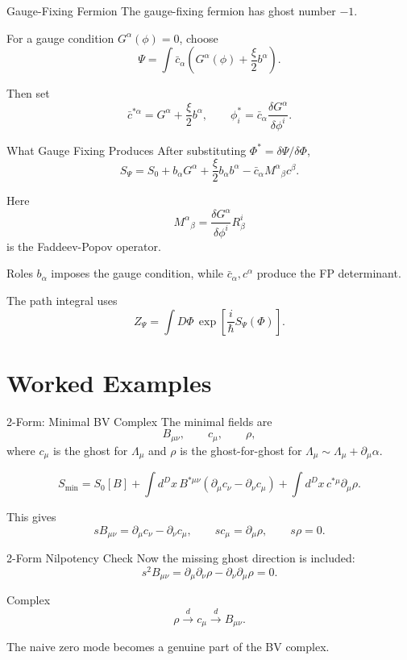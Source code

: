 \documentclass[aspectratio=169,professionalfonts]{beamer}
\begin{document}
\begin{frame}{Gauge-Fixing Fermion}
  The gauge-fixing fermion has ghost number $-1$.

  For a gauge condition $G^\alpha(\phi)=0$, choose
  \[
    \Psi
    =\int \bar c_\alpha
    \left(G^\alpha(\phi)+\frac{\xi}{2}b^\alpha\right).
  \]

  Then set
  \[
    \bar c^{*\alpha}=G^\alpha+\frac{\xi}{2}b^\alpha,
    \qquad
    \phi_i^*=\bar c_\alpha\frac{\delta G^\alpha}{\delta\phi^i}.
  \]
\end{frame}

\begin{frame}{What Gauge Fixing Produces}
  After substituting $\Phi^*=\delta\Psi/\delta\Phi$,
  \[
    S_\Psi
    =S_0
    +b_\alpha G^\alpha
    +\frac{\xi}{2}b_\alpha b^\alpha
    -\bar c_\alpha M^\alpha{}_\beta c^\beta .
  \]

  Here
  \[
    M^\alpha{}_\beta
    =\frac{\delta G^\alpha}{\delta\phi^i}R^i_\beta
  \]
  is the Faddeev-Popov operator.

  \begin{block}{Roles}
    $b_\alpha$ imposes the gauge condition, while
    $\bar c_\alpha,c^\alpha$ produce the FP determinant.
  \end{block}

  The path integral uses
  \[
    Z_\Psi=\int D\Phi\,
    \exp\left[\frac{i}{\hbar}S_\Psi(\Phi)\right].
  \]
\end{frame}

\section{Worked Examples}

\begin{frame}{2-Form: Minimal BV Complex}
  The minimal fields are
  \[
    B_{\mu\nu},\qquad c_\mu,\qquad \rho,
  \]
  where $c_\mu$ is the ghost for $\Lambda_\mu$ and $\rho$ is the
  ghost-for-ghost for $\Lambda_\mu\sim\Lambda_\mu+\partial_\mu\alpha$.

  \[
    S_{\min}
    =S_0[B]
    +\int d^Dx\,B^{*\mu\nu}
    (\partial_\mu c_\nu-\partial_\nu c_\mu)
    +\int d^Dx\,c^{*\mu}\partial_\mu\rho .
  \]

  This gives
  \[
    sB_{\mu\nu}=\partial_\mu c_\nu-\partial_\nu c_\mu,
    \qquad
    sc_\mu=\partial_\mu\rho,
    \qquad
    s\rho=0 .
  \]
\end{frame}

\begin{frame}{2-Form Nilpotency Check}
  Now the missing ghost direction is included:
  \[
    s^2B_{\mu\nu}
    =\partial_\mu\partial_\nu\rho
    -\partial_\nu\partial_\mu\rho=0 .
  \]

  \begin{exampleblock}{Complex}
    \[
      \rho
      \xrightarrow{\ d\ }
      c_\mu
      \xrightarrow{\ d\ }
      B_{\mu\nu}.
    \]
  \end{exampleblock}

  The naive zero mode becomes a genuine part of the BV complex.
\end{frame}
\end{document}
